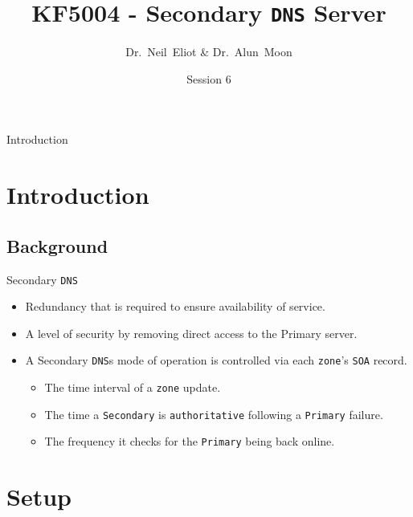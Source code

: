 \documentclass[xcolor=table]{beamer}
\title{KF5004 - Secondary \texttt{DNS} Server}
\author{Dr.~Neil~Eliot \& Dr.~Alun~Moon}
\institute[Northumbria University] %
{
  Department of Computer and Information Sciences\\
  University of Northumbria
}
\date{Session 6}
\begin{document}
\begin{frame}
  \titlepage
\end{frame}

\begin{frame}{Introduction}
  \tableofcontents
\end{frame}


\section{Introduction}
\subsection{Background}
\begin{frame}{Secondary \texttt{DNS}}
  \begin{itemize}
    \item Redundancy that is required to ensure availability of service.
    \item A level of security by removing direct access to the Primary server.
    \item A Secondary \texttt{DNS}s mode of operation is controlled via each \texttt{zone}’s \texttt{SOA} record.
      \begin{itemize}
        \item The time interval of a \texttt{zone} update.
        \item The time a \texttt{Secondary} is \texttt{authoritative} following a \texttt{Primary} failure.
        \item The frequency it checks for the \texttt{Primary} being back online.
      \end{itemize}
  \end{itemize}
\end{frame}

\section{Setup}
\end{document}
